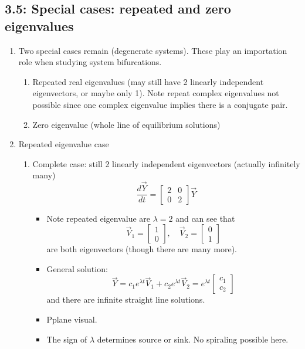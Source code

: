 \documentclass{article}
\begin{document}
\subsection{3.5: Special cases: repeated and zero eigenvalues}

\begin{enumerate}

\item Two special cases remain (degenerate systems). These play an importation role when studying system bifurcations.
\begin{enumerate}
\item Repeated real eigenvalues (may still have 2 linearly independent eigenvectors, or maybe only 1). Note repeat complex eigenvalues not possible since one complex eigenvalue implies there is a conjugate pair.
\item Zero eigenvalue (whole line of equilibrium solutions)
\end{enumerate}


\item Repeated eigenvalue case
\begin{enumerate}
\item Complete case: still 2 linearly independent eigenvectors (actually infinitely many)
\[
\frac{d\vec{Y}}{dt} = 
\begin{bmatrix}
2 & 0 \\
0 & 2
\end{bmatrix} \vec{Y}
\]
\begin{itemize}
\item Note repeated eigenvalue are $\lambda = 2$ and can see that 
\[
\vec{V}_1 = 
\begin{bmatrix}
1 \\ 0
\end{bmatrix},
\quad 
\vec{V}_2 = 
\begin{bmatrix}
0 \\ 1
\end{bmatrix} 
\]
are both eigenvectors (though there are many more).
\item General solution:
\[
\vec{Y} = c_1 e^{\lambda t} \vec{V}_1 + c_2 e^{\lambda t} \vec{V}_2 
= e^{\lambda t} \begin{bmatrix}
c_1 \\ c_2
\end{bmatrix}
\]
and there are infinite straight line solutions.
\item Pplane visual.
\item The sign of $\lambda$ determines source or sink. No spiraling possible here. 
\end{itemize}


\end{enumerate}
\end{enumerate}
\end{document}
